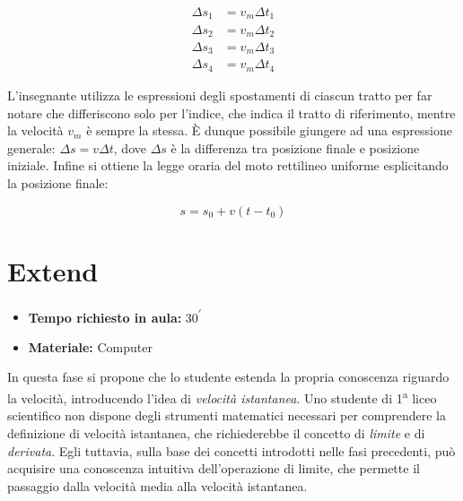 \documentclass{report} \usepackage[T1]{fontenc} \usepackage[italian]{babel}
\begin{document}
\begin{align}
\Delta s_1 &= v_m \Delta t_1 \\
\Delta s_2 &= v_m \Delta t_2 \\
\Delta s_3 &= v_m \Delta t_3 \\
\Delta s_4 &= v_m \Delta t_4
\end{align}

L’insegnante utilizza le espressioni degli spostamenti di ciascun tratto
per far notare che differiscono solo per l’indice, che indica il tratto di
riferimento, mentre la velocità $v_m$ è sempre la stessa. \`E dunque possibile
giungere ad una espressione generale: $\Delta s= v \Delta t$, dove $\Delta s$
è la differenza tra posizione finale e posizione iniziale.
Infine si ottiene la legge oraria del moto rettilineo uniforme esplicitando la
posizione finale:

\begin{equation}
s = s_0 + v (t - t_0)
\end{equation}

\pagebreak

\section{Extend}

\begin{itemize}
\item \textbf{Tempo richiesto in aula:} 30\textsuperscript{$\prime$}
\item \textbf{Materiale:} Computer
\end{itemize}

In questa fase si propone che lo studente estenda la propria conoscenza
riguardo la velocità, introducendo l'idea di \emph{velocità istantanea}.
Uno studente di 1\textsuperscript{a} liceo scientifico non dispone
degli strumenti matematici necessari per comprendere la definizione
di velocità istantanea, che richiederebbe il concetto
di \emph{limite} e di \emph{derivata}. Egli tuttavia, sulla base
dei concetti introdotti nelle fasi precedenti, può acquisire
una conoscenza intuitiva dell'operazione di limite, che permette
il passaggio dalla velocità media alla velocità istantanea.
\end{document}
